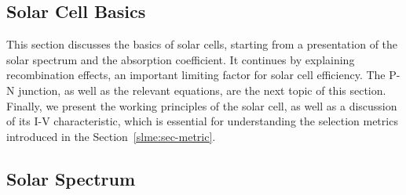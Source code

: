 \begin{refsection}
 
 
\section{Solar Cell Basics} \label{slme:sec-basics} 
 
This section discusses the basics of solar cells, starting from a presentation 
of the solar spectrum and the absorption coefficient. It continues by 
explaining recombination effects, an important limiting factor for solar cell 
efficiency. The P-N junction, as well as the relevant equations, are the next 
topic of this section. Finally, we present the working principles of the solar 
cell, as well as a discussion of its I-V characteristic, which is essential 
for understanding the selection metrics introduced in the 
Section~\ref{slme:sec-metric}. 
 
\subsection{Solar Spectrum} 
 

\end{refsection}
